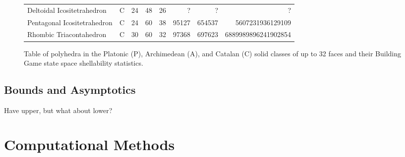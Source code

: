 \begin{figure}[ht]
{\begin{tabular}{ l | c | c | c | c || r | r | r}
Deltoidal Icositetrahedron      & C & 24 & 48 & 26 	& ?	& ? & ?\\
Pentagonal Icositetrahedron     & C & 24 & 60 & 38 	& 95127	& 654537 & 5607231936129109\\
Rhombic Triacontahedron         & C & 30 & 60 & 32 	& 97368	& 697623 & 6889989896241902854\\
  \hline  
\end{tabular}
}
\caption{Table of polyhedra in the Platonic (P), Archimedean (A), and Catalan (C) solid classes of up to 32 faces and their Building Game state space shellability statistics.}
\label{fig:bgtable_shell}
\end{figure}


\subsection{Bounds and Asymptotics}
Have upper, but what about lower? 

\section{Computational Methods}
